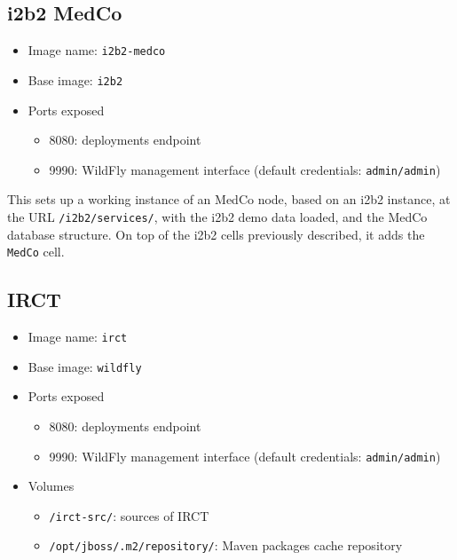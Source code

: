 \subsection{i2b2 MedCo}
\begin{itemize}
    \item Image name: \verb|i2b2-medco|
    \item Base image: \verb|i2b2|
    \item Ports exposed
        \begin{itemize}
        \item 8080: deployments endpoint
        \item 9990: WildFly management interface (default credentials: \verb|admin/admin|)
        \end{itemize}
\end{itemize}

This sets up a working instance of an MedCo node, based on an i2b2 instance, at the URL \verb|/i2b2/services/|, with the i2b2 demo data loaded, and the MedCo database structure.
On top of the i2b2 cells previously described, it adds the \verb|MedCo| cell.

\subsection{IRCT}

\begin{itemize}
    \item Image name: \verb|irct|
    \item Base image: \verb|wildfly|
    \item Ports exposed
        \begin{itemize}
        \item 8080: deployments endpoint
        \item 9990: WildFly management interface (default credentials: \verb|admin/admin|)
        \end{itemize}
        
    \item Volumes
        \begin{itemize}
        \item \verb|/irct-src/|: sources of IRCT
        \item \verb|/opt/jboss/.m2/repository/|: Maven packages cache repository
        \end{itemize}
\end{itemize}


